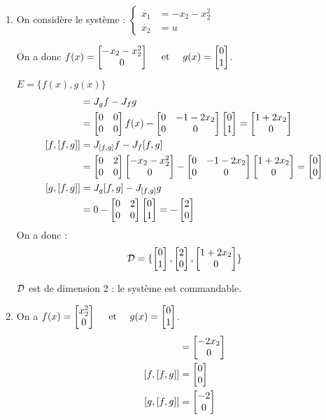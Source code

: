 \documentclass{../../td}{subfiles}
\begin{document}
\begin{enumerate}
\item On considère le système :
  $ \begin{cases}
\dot{x_1} & = -x_2 -x_2^2\\
    \dot{x_2} & = u
\end{cases}
$

On a donc $f(x) = \begin{bmatrix}  -x_2-x_2^2 \\ 0 \end{bmatrix} \quad\text{ et }\quad g(x) = \begin{bmatrix} 0 \\ 1 \end{bmatrix}$.

$E=\{f(x),g(x)\}$
\begin{align*}
[f,g] & = J_gf - J_fg \\
& = \vect{0 & 0 \\ 0 & 0}f(x)-\vect{0 & -1 -2x_2\\0 & 0} \vect{0 \\ 1} = \vect{1 + 2x_2 \\ 0}\\
[f,[f,g]] & = J_{[f,g]}f - J_f[f,g] \\
& = \vect{0 & 2\\0 & 0} \vect{-x_2 -x_2^2 \\ 0} - \vect{0 & -1-2x_2\\0 & 0} \vect{ 1 + 2x_2 \\ 0} = \vect{0 \\ 0} \\
[g,[f,g]] & = J_g[f,g] - J_{[f,g]}g \\
& = 0 - \vect{0 & 2\\0 & 0} \vect{0 \\ 1} = -\vect{2 \\ 0} 
\end{align*}
On a donc : \[
\mathcal{D} = \{\begin{bmatrix} 0 \\ 1 \end{bmatrix}, \begin{bmatrix} 2 \\ 0 \end{bmatrix}, \begin{bmatrix} 1+2x_2 \\ 0 \end{bmatrix}\}\]

$\mathcal{D}$ est de dimension 2 : le système est commandable.

\item On a $f(x) = \begin{bmatrix} x_2^2 \\ 0 \end{bmatrix} \quad\text{ et }\quad g(x) = \begin{bmatrix} 0 \\ 1 \end{bmatrix}$.
\begin{align*}
[f,g] & = \vect{-2 x_2 \\ 0} \\
[f,[f,g]] & = \vect{0 \\ 0} \\
[g,[f,g]] & = \vect{-2 \\ 0} 
\end{align*}


\end{enumerate}
\end{document}
